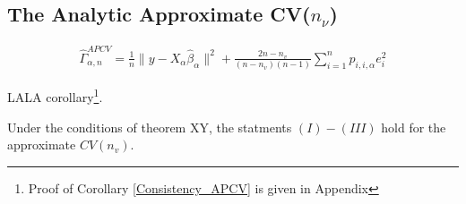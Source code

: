 \documentclass[Research_Module_ES.tex]{subfiles}
\begin{document}
\subsection{The Analytic Approximate CV($n_\nu$)}
\begin{align*}
\hat{\Gamma}_{\alpha,n}^{APCV}=\frac{1}{n}\lVert y-X_\alpha\hat{\beta}_\alpha\rVert^2 + \frac{2n-n_v}{(n-n_v)(n-1)}\sum_{i=1}^np_{i,i,\alpha}e_i^2
\end{align*}

LALA corollary\footnote{Proof of Corollary \ref{Consistency_APCV} is given in Appendix }.

\begin{coro}
\label{Consistency_APCV}
Under the conditions of theorem XY, the statments $(I)-(III)$ hold for the approximate $CV(n_v)$.
\end{coro}
\end{document}
